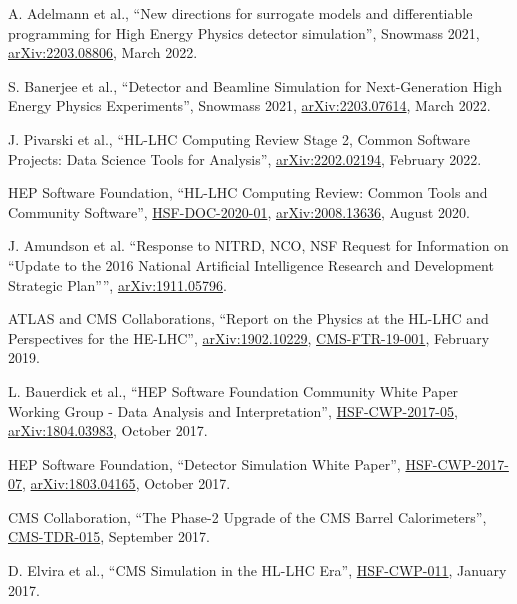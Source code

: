 \begin{description}[leftmargin=12pt,font=\normalfont,labelsep=0em]
\item A. Adelmann et al., ``New directions for surrogate models and differentiable programming for High Energy Physics detector simulation'', Snowmass 2021, \href{https://arxiv.org/abs/2203.08806}{arXiv:2203.08806}, March 2022. %
\item S. Banerjee et al., ``Detector and Beamline Simulation for Next-Generation High Energy Physics Experiments'', Snowmass 2021, \href{https://arxiv.org/abs/2203.07614}{arXiv:2203.07614}, March 2022. %
\item J. Pivarski et al., ``HL-LHC Computing Review Stage 2, Common Software Projects: Data Science Tools for Analysis'', \href{https://arxiv.org/abs/2202.02194}{arXiv:2202.02194}, February 2022. %
\item HEP Software Foundation, ``HL-LHC Computing Review: Common Tools and Community Software'', \href{https://dx.doi.org/10.5281/zenodo.4009114}{HSF-DOC-2020-01}, \href{https://arxiv.org/abs/2008.13636}{arXiv:2008.13636}, August 2020. %
\item J. Amundson et al. ``Response to NITRD, NCO, NSF Request for Information on ``Update to the 2016 National Artificial Intelligence Research and Development Strategic Plan'''', \href{https://arxiv.org/abs/1911.05796}{arXiv:1911.05796}. %
\item \begin{sloppypar}ATLAS and CMS Collaborations, ``Report on the Physics at the HL-LHC and Perspectives for the HE-LHC'', \href{http://arxiv.org/abs/arXiv:1902.10229}{arXiv:1902.10229}, \href{https://cds.cern.ch/record/2651134}{CMS-FTR-19-001}, February 2019.\end{sloppypar} %
\item L. Bauerdick et al., ``HEP Software Foundation Community White Paper Working Group - Data Analysis and Interpretation'', \href{http://hepsoftwarefoundation.org/activities/cwp.html}{HSF-CWP-2017-05}, \href{https://arxiv.org/abs/1804.03983}{arXiv:1804.03983}, October 2017. %
\item HEP Software Foundation, ``Detector Simulation White Paper'', \href{http://hepsoftwarefoundation.org/activities/cwp.html}{HSF-CWP-2017-07}, \href{https://arxiv.org/abs/1803.04165}{arXiv:1803.04165}, October 2017. %
\item CMS Collaboration, ``The Phase-2 Upgrade of the CMS Barrel Calorimeters'', \href{https://cds.cern.ch/record/2283187}{CMS-TDR-015}, September 2017.
\item D. Elvira et al., ``CMS Simulation in the HL-LHC Era'', \href{http://hepsoftwarefoundation.org/cwp-whitepapers.html}{HSF-CWP-011}, January 2017.

\end{description}

